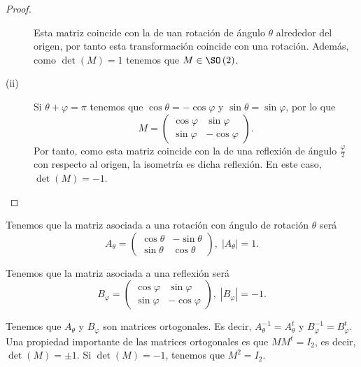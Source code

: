 \begin{proof}
\begin{description}
Esta matriz coincide con la de uan rotación de ángulo $\displaystyle \theta $ alrededor del origen, por tanto esta transformación coincide con una rotación. Además, como $\displaystyle \det\left(M\right) = 1 $ tenemos que $\displaystyle M \in \SO\left(2\right) $.
\item[(ii)] Si $\displaystyle \theta+\varphi = \pi  $ tenemos que $\displaystyle \cos\theta = -\cos\varphi $ y $\displaystyle \sin\theta = \sin\varphi $, por lo que 
	\[M = \begin{pmatrix} \cos\varphi & \sin\varphi \\ \sin\varphi & -\cos\varphi \end{pmatrix} .\]
Por tanto, como esta matriz coincide con la de una reflexión de ángulo $\displaystyle \frac{\varphi}{2} $ con respecto al origen, la isometría es dicha reflexión. En este caso, $\displaystyle \det\left(M\right) = -1 $.
\end{description}
\end{proof}

\begin{observation}
\normalfont Tenemos que la matriz asociada a una rotación con ángulo de rotación $\displaystyle \theta  $ será
\[A_{\theta } = \begin{pmatrix} \cos\theta & -\sin\theta \\ \sin\theta & \cos\theta \end{pmatrix}, \; \left|A_{\theta }\right| = 1 .\]
\end{observation}

\begin{observation}
\normalfont Tenemos que la matriz asociada a una reflexión será
\[B_{\varphi }=\begin{pmatrix} \cos\varphi & \sin\varphi \\ \sin\varphi & -\cos\varphi  \end{pmatrix}, \; \left|B_{\varphi}\right|=-1 .\]
\end{observation}

\begin{observation}
\normalfont Tenemos que $\displaystyle A_{\theta} $ y $\displaystyle B_{\varphi} $ son matrices ortogonales. Es decir, $\displaystyle A^{-1}_{\theta} = A^{t}_{\theta} $ y $\displaystyle B^{-1}_{\varphi} = B^{t}_{\varphi} $. Una propiedad importante de las matrices ortogonales es que $\displaystyle MM^{t}=I_{2} $, es decir, $\displaystyle \det\left(M\right)= \pm 1 $. Si $\displaystyle \det\left(M\right)=-1 $, tenemos que $\displaystyle M^{2}=I_{2} $.
\end{observation}

